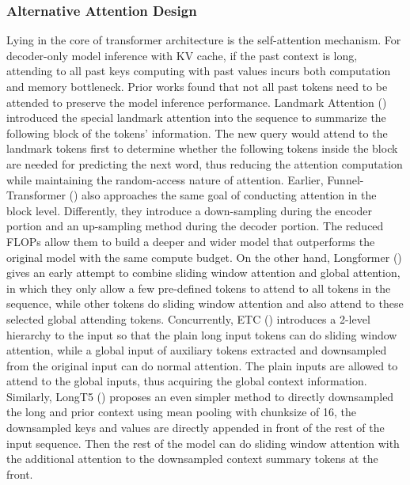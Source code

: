 \subsubsection{Alternative Attention Design} \label{efficient_attention} 
Lying in the core of transformer architecture is the self-attention mechanism. For decoder-only model inference with KV cache, if the past context is long, attending to all past keys computing with past values incurs both computation and memory bottleneck. Prior works found that not all past tokens need to be attended to preserve the model inference performance. Landmark Attention (\cite{mohtashami2023landmark}) introduced the special landmark attention into the sequence to summarize the following block of the tokens' information. The new query would attend to the landmark tokens first to determine whether the following tokens inside the block are needed for predicting the next word, thus reducing the attention computation while maintaining the random-access nature of attention. 
Earlier, Funnel-Transformer (\cite{dai2020funnel}) also approaches the same goal of conducting attention in the block level. Differently, they introduce a down-sampling during the encoder portion and an up-sampling method during the decoder portion. The reduced FLOPs allow them to build a deeper and wider model that outperforms the original model with the same compute budget. 
On the other hand, Longformer (\cite{beltagy2020longformer}) gives an early attempt to combine sliding window attention and global attention, in which they only allow a few pre-defined tokens to attend to all tokens in the sequence, while other tokens do sliding window attention and also attend to these selected global attending tokens. Concurrently, ETC (\cite{ainslie2020etc}) introduces a 2-level hierarchy to the input so that the plain long input tokens can do sliding window attention, while a global input of auxiliary tokens extracted and downsampled from the original input can do normal attention. The plain inputs are allowed to attend to the global inputs, thus acquiring the global context information. Similarly, LongT5 (\cite{guo2022longt5}) proposes an even simpler method to directly downsampled the long and prior context using mean pooling with chunksize of 16, the downsampled keys and values are directly appended in front of the rest of the input sequence. Then the rest of the model can do sliding window attention with the additional attention to the downsampled context summary tokens at the front. 
